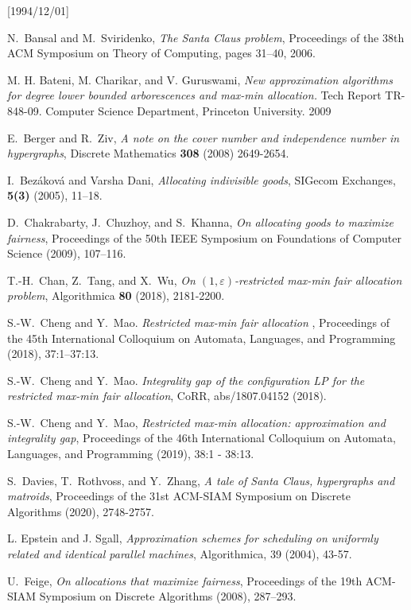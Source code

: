 \NeedsTeXFormat{LaTeX2e}[1994/12/01]\documentclass[letterpaper, 11pt]{article}
\theoremstyle{definition}
\theoremstyle{remark}
\numberwithin{equation}{section}
\begin{document}
\begin{thebibliography}{10}
N.~Bansal and M.~Sviridenko, \emph{The Santa Claus problem}, Proceedings
of the 38th ACM Symposium on Theory of Computing, pages 31–40, 2006.

  M. H. Bateni, M. Charikar, and V. Guruswami, \emph{New approximation
    algorithms for degree lower bounded arborescences and max-min
    allocation.} Tech Report TR-848-09. Computer Science Department,
    Princeton University. 2009
  
E.~Berger and R.~Ziv, \emph{A note on the cover number and independence number in hypergraphs}, Discrete Mathematics \textbf{308} (2008) 2649-2654.

I.~Bez\'akov\'a and Varsha Dani, \emph{Allocating indivisible goods},
SIGecom Exchanges, \textbf{5(3)} (2005), 11–18.

D.~Chakrabarty, J.~Chuzhoy, and S.~Khanna, \emph{On allocating goods to
  maximize fairness},
Proceedings of the 50th IEEE Symposium on Foundations of Computer
Science (2009), 107–116.

T.-H.~Chan, Z.~Tang, and X.~Wu, \emph{On $(1,\varepsilon)$-restricted max-min fair allocation problem}, Algorithmica \textbf{80} (2018), 2181-2200. 

S.-W.~Cheng and Y.~Mao. \emph{Restricted max-min fair allocation} , Proceedings of the 45th
International Colloquium on Automata, Languages, and Programming (2018), 37:1–37:13.

S.-W.~Cheng and Y.~Mao. \emph{Integrality gap of the configuration LP for the restricted max-min
  fair allocation}, CoRR, abs/1807.04152 (2018).

S.-W.~Cheng and Y.~Mao, \emph{Restricted max-min allocation:
  approximation and integrality gap}, Proceedings of the 46th
International Colloquium on Automata, Languages, and Programming
(2019), 38:1 - 38:13.

S.~Davies, T.~Rothvoss, and Y.~Zhang, \emph{A tale of Santa Claus,
  hypergraphs and matroids}, Proceedings of
the 31st ACM-SIAM 
Symposium on Discrete Algorithms (2020), 2748-2757.

L. Epstein and J. Sgall, \emph{Approximation schemes for scheduling on
  uniformly related and identical parallel machines}, Algorithmica, 39
(2004), 43-57.

U.~Feige, \emph{On allocations that maximize fairness}, Proceedings of
the 19th ACM-SIAM 
Symposium on Discrete Algorithms (2008), 287–293.


\end{thebibliography}
\end{document}
